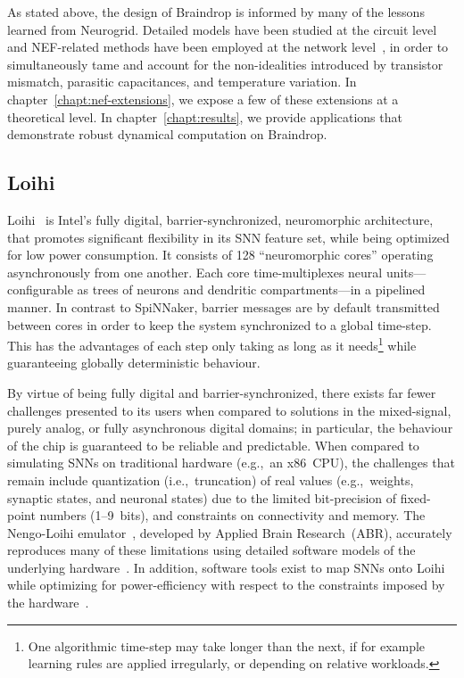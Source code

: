 As stated above, the design of Braindrop is informed by many of the lessons learned from Neurogrid.
Detailed models have been studied at the circuit level~\citep{benjamintemp2019} and NEF-related methods have been employed at the network level~\citep{voelker2017iscas, reidpint2019}, in order to simultaneously tame and account for the non-idealities introduced by transistor mismatch, parasitic capacitances, and temperature variation.
In chapter~\ref{chapt:nef-extensions}, we expose a few of these extensions at a theoretical level.
In chapter~\ref{chapt:results}, we provide applications that demonstrate robust dynamical computation on Braindrop.



\subsection{Loihi}

Loihi~\citep{davies2018loihi} is Intel's fully digital, barrier-synchronized, neuromorphic architecture, that promotes significant flexibility in its SNN feature set, while being optimized for low power consumption.
It consists of 128 ``neuromorphic cores'' operating asynchronously from one another.
Each core time-multiplexes  neural units---configurable as trees of neurons and dendritic compartments---in a pipelined manner.
In contrast to SpiNNaker, barrier messages are by default transmitted between cores in order to keep the system synchronized to a global time-step.
This has the advantages of each step only taking as long as it needs\footnote{
One algorithmic time-step may take longer than the next, if for example learning rules are applied irregularly, or depending on relative workloads.} 
while guaranteeing globally deterministic behaviour.

By virtue of being fully digital and barrier-synchronized, there exists far fewer challenges presented to its users when compared to solutions in the mixed-signal, purely analog, or fully asynchronous digital domains; in particular, the behaviour of the chip is guaranteed to be reliable and predictable.
When compared to simulating SNNs on traditional hardware (e.g.,~an x86~CPU), the challenges that remain include quantization (i.e.,~truncation) of real values (e.g.,~weights, synaptic states, and neuronal states) due to the limited bit-precision of fixed-point numbers (1--9~bits), and constraints on connectivity and memory.
The Nengo-Loihi emulator~\citep{nengoloihi}, developed by Applied Brain Research~(ABR), accurately reproduces many of these limitations using detailed software models of the underlying hardware~\citep{blouw2018a}.
In addition, software tools exist to map SNNs onto Loihi while optimizing for power-efficiency with respect to the constraints imposed by the hardware~\citep{lin2018programming, lin2018mapping}.


